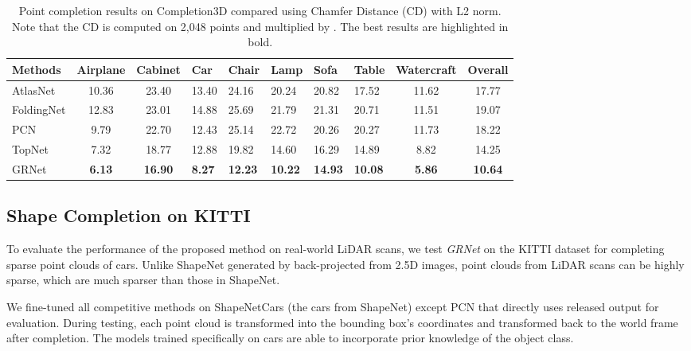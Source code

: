 \documentclass[runningheads]{llncs}
\begin{document}
\begin{table*}[!t]
  \caption{Point completion results on Completion3D compared using Chamfer Distance (CD) with L2 norm. Note that the CD is computed on 2,048 points and multiplied by . The best results are highlighted in bold.}
  \begin{tabularx}{\linewidth}{l|ccYYYYYc|c}
    \toprule
    Methods      & Airplane   & Cabinet    & Car        & Chair 
                 & Lamp       & Sofa       & Table      & Watercraft 
                 & Overall \\
    \midrule  
    AtlasNet \cite{DBLP:conf/cvpr/GroueixFKRA18}    
                 & 10.36      & 23.40      & 13.40      & 24.16
                 & 20.24      & 20.82      & 17.52      & 11.62
                 & 17.77 \\
    FoldingNet \cite{DBLP:conf/cvpr/YangFST18}
                 & 12.83      & 23.01      & 14.88      & 25.69
                 & 21.79      & 21.31      & 20.71      & 11.51
                 & 19.07 \\
    PCN \cite{DBLP:conf/ThreeDim/YuanKHMH18}
                 & 9.79       & 22.70      & 12.43      & 25.14
                 & 22.72      & 20.26      & 20.27      & 11.73
                 & 18.22 \\
    TopNet \cite{DBLP:conf/cvpr/TchapmiKR0S19}
                 & 7.32       & 18.77      & 12.88      & 19.82
                 & 14.60      & 16.29      & 14.89      & 8.82
                 & 14.25 \\
    GRNet        & \bf{6.13}  & \bf{16.90} & \bf{8.27}  & \bf{12.23}
                 & \bf{10.22} & \bf{14.93} & \bf{10.08} & \bf{5.86}
                 & \bf{10.64} \\
  	\bottomrule
  \end{tabularx}
  \label{tab:completion-3d-reconstruction}
\end{table*}

\subsection{Shape Completion on KITTI}

To evaluate the performance of the proposed method on real-world LiDAR scans, we test {\it GRNet} on the KITTI dataset for completing sparse point clouds of cars.
Unlike ShapeNet generated by back-projected from 2.5D images, point clouds from LiDAR scans can be highly sparse, which are much sparser than those in ShapeNet.

We fine-tuned all competitive methods on ShapeNetCars (the cars from ShapeNet) except PCN that directly uses released output for evaluation.
During testing, each point cloud is transformed into the bounding box's coordinates and transformed back to the world frame after completion.
The models trained specifically on cars are able to incorporate prior knowledge of the object class.
\end{document}

